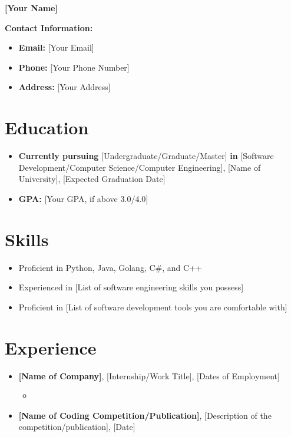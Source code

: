 \documentclass{article}
\begin{document}
\begin{center}
\textbf{\LARGE [Your Name]}
\end{center}

\begin{flushleft}
\textbf{Contact Information:}
\begin{itemize}
\item \textbf{Email:} [Your Email]
\item \textbf{Phone:} [Your Phone Number]
\item \textbf{Address:} [Your Address]
\end{itemize}
\end{flushleft}

\section*{Education}

\begin{itemize}
\item \textbf{Currently pursuing} [Undergraduate/Graduate/Master] \textbf{in} [Software Development/Computer Science/Computer Engineering], [Name of University], [Expected Graduation Date]
\item \textbf{GPA:} [Your GPA, if above 3.0/4.0]
\end{itemize}

\section*{Skills}

\begin{itemize}
\item Proficient in Python, Java, Golang, C\#, and C++
\item Experienced in [List of software engineering skills you possess]
\item Proficient in [List of software development tools you are comfortable with]
\end{itemize}

\section*{Experience}

\begin{itemize}
\item \textbf{[Name of Company]}, [Internship/Work Title], [Dates of Employment]
\begin{itemize}
  \item [List of responsibilities and achievements from your internship/work experience]
\end{itemize}
\item \textbf{[Name of Coding Competition/Publication]}, [Description of the competition/publication], [Date]
\end{itemize}
\end{document}
